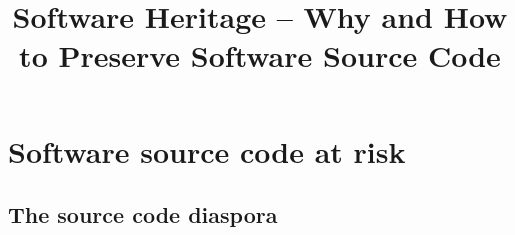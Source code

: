 \documentclass[11pt]{article}
\title{Software Heritage -- Why and How to Preserve Software Source Code}
\begin{document}
    \maketitle
    \tableofcontents
    \newpage

    \hypertarget{software-source-code-at-risk}{%
\section{Software source code at
risk}\label{software-source-code-at-risk}}

\hypertarget{the-source-code-diaspora}{%
\subsection{The source code diaspora}\label{the-source-code-diaspora}}
\end{document}
